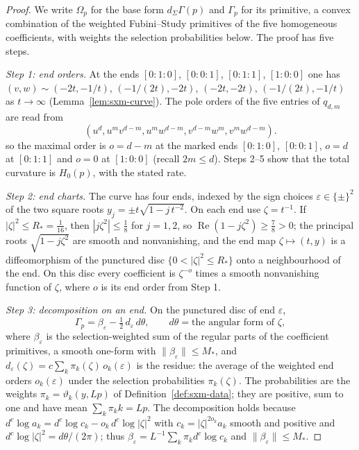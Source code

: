 \begin{proof}
We write $\Omega_p$ for the base form $d_\Sigma\Gamma(p)$ and $\Gamma_p$ for its primitive, a convex combination of
the weighted Fubini--Study primitives of the five homogeneous coefficients, with weights the selection
probabilities below. The proof has five steps.

\emph{Step 1: end orders.} At the ends $[0{:}1{:}0]$, $[0{:}0{:}1]$, $[0{:}1{:}1]$, $[1{:}0{:}0]$ one has
$(v,w)\sim(-2t,-1/t)$, $(-1/(2t),-2t)$, $(-2t,-2t)$, $(-1/(2t),-1/t)$ as $t\to\infty$ (Lemma~\ref{lem:sxm-curve}). The pole
orders of the five entries of $q_{d,m}$ are read from
\[
 (u^d,u^mv^{d-m},u^mw^{d-m},v^{d-m}w^m,v^mw^{d-m}).
\]
so the maximal order is $o=d-m$ at the marked ends $[0{:}1{:}0]$, $[0{:}0{:}1]$, $o=d$ at $[0{:}1{:}1]$ and $o=0$ at
$[1{:}0{:}0]$ (recall $2m\le d$). Steps 2--5 show that the total curvature is $H_0(p)$, with the stated rate.

\emph{Step 2: end charts.} The curve has four ends, indexed by the sign choices $\varepsilon\in\{\pm\}^2$ of the two
square roots $y_j=\pm t\sqrt{1-j\,t^{-2}}$. On each end use $\zeta=t^{-1}$. If $|\zeta|^2\le R_*=\frac1{16}$, then
$|j\zeta^2|\le\frac18$ for $j=1,2$, so $\operatorname{Re}(1-j\zeta^2)\ge\frac78>0$; the principal roots
$\sqrt{1-j\zeta^2}$ are smooth and nonvanishing, and the end map $\zeta\mapsto(t,y)$ is a diffeomorphism of the
punctured disc $\{0<|\zeta|^2\le R_*\}$ onto a neighbourhood of the end. On this disc every coefficient is
$\zeta^{-o}$ times a smooth nonvanishing function of $\zeta$, where $o$ is its end order from Step 1.

\emph{Step 3: decomposition on an end.} On the punctured disc of end $\varepsilon$,
\[
 \Gamma_p=\beta_{\varepsilon}-\tfrac12\,d_{\varepsilon}\,d\theta,\qquad d\theta=\text{the angular form of }\zeta,
\]
where $\beta_\varepsilon$ is the selection-weighted sum of the regular parts of the coefficient primitives, a smooth
one-form with $\|\beta_\varepsilon\|\le M_*$, and $d_\varepsilon(\zeta)=c\sum_k\pi_k(\zeta)\,o_k(\varepsilon)$ is the residue: the
average of the weighted end orders $o_k(\varepsilon)$ under the selection probabilities $\pi_k(\zeta)$. The probabilities are the weights $\pi_k=\vartheta_k(y,Lp)$ of Definition~\ref{def:sxm-data}; they are positive, sum to one
and have mean $\sum_k\pi_kk=Lp$. The decomposition holds because $d^c\log a_k=d^c\log c_k-o_k\,d^c\log|\zeta|^2$ with
$c_k=|\zeta|^{2o_k}a_k$ smooth and positive and $d^c\log|\zeta|^2=d\theta/(2\pi)$; thus
$\beta_\varepsilon=L^{-1}\sum_k\pi_kd^c\log c_k$ and $\|\beta_\varepsilon\|\le M_*$.


\end{proof}
